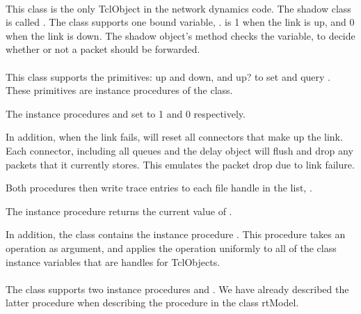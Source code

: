 \paragraph{\protect{}}
This class is the only TclObject in the network dynamics code.
The shadow class is called .
The class supports one bound variable, .
 is 1 when the link is up, and 0 when the link is down.
The shadow object's 
method checks the  variable, to decide whether or not
a packet should be forwarded.

\paragraph{\protect{}}
This class supports the primitives:
up and down, and up? to set and query .
These primitives are instance procedures of the class.
\begin{list}{}{}
\item  The instance procedures
   and
  set  to 1 and 0 respectively.

  In addition, when the link fails, 
  will reset all connectors that make up the link.
  Each connector, including all queues and the delay object
  will flush and drop any packets that it currently stores.
  This emulates the packet drop due to link failure.

  Both procedures then write trace entries to each file handle
  in the list, .

\item The instance procedure
  returns the current value of .
\end{list}
In addition, the class contains the instance procedure
.
This procedure takes an operation as argument, and applies
the operation uniformly to all of the class instance variables
that are handles for TclObjects.

\paragraph{\protect{}}
The class supports two instance procedures
 and
.
We have already described the latter procedure when describing the
 procedure in the class rtModel.

